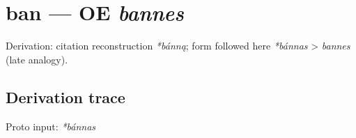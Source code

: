 \documentclass[
  british,
  a4paper,
  openany]{book}
\providecommand{\texorpdfstring}[2]{#1}
\begin{document}
\section{\texorpdfstring{ban --- OE
\emph{bannes}}{ban --- OE bannes}}\label{ban-oe-bannes}


Derivation: citation reconstruction \emph{*bánną}; form followed here
\emph{*bánnas} \textgreater{} \emph{bannes} (late analogy).

\subsection{Derivation trace}\label{derivation-trace-108}

Proto input: \emph{*bánnas}

\begingroup
\setlength{\fboxsep}{6pt}
\end{document}
